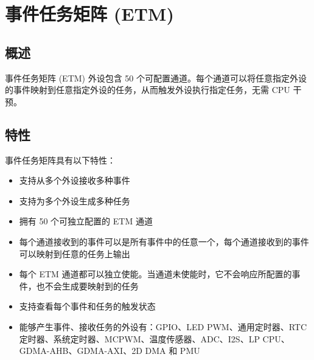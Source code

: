 \documentclass[main\_\_CN.tex]{subfiles}
\begin{document}

\ifglobal
\else
    {\let\clearpage\relax \listoftodos}
    {\let\clearpage\relax \listofdonetodos}
    \tableofcontents
\fi



\hypertarget{evntaskmatrix}{}
\chapter{事件任务矩阵 (ETM)}
\label{mod:evntaskmatrix}



\section{概述}
事件任务矩阵 (ETM) 外设包含 50 个可配置通道。每个通道可以将任意指定外设的事件映射到任意指定外设的任务，从而触发外设执行指定任务，无需 CPU 干预。


\section{特性}
\label{sec:evntaskmatrix-features}

事件任务矩阵具有以下特性：
\begin{itemize}
    \item 支持从多个外设接收多种事件
    \item 支持为多个外设生成多种任务
    \item 拥有 50 个可独立配置的 ETM 通道
    \item 每个通道接收到的事件可以是所有事件中的任意一个，每个通道接收到的事件可以映射到任意的任务上输出
    \item 每个 ETM 通道都可以独立使能。当通道未使能时，它不会响应所配置的事件，也不会生成要映射到的任务
    \item 支持查看每个事件和任务的触发状态
    \item 能够产生事件、接收任务的外设有：GPIO、LED PWM、通用定时器、RTC 定时器、系统定时器、MCPWM、温度传感器、ADC、I2S、LP CPU、GDMA-AHB、GDMA-AXI、2D DMA 和 PMU
\end{itemize}
\end{document}
